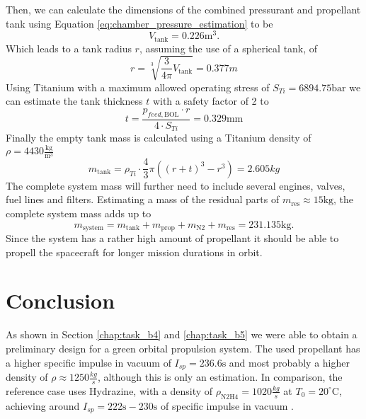 \documentclass[12pt]{article}
\begin{document}
Then, we can calculate the dimensions of the combined pressurant and propellant tank using Equation \ref{eq:chamber_pressure_estimation} to be
\begin{equation*}
	V_{\text{tank}} = 0.226\text{m}^3.
\end{equation*}
Which leads to a tank radius $r$, assuming the use of a spherical tank, of
\begin{equation*}
	r = \sqrt[3]{\frac{3}{4\pi} V_{\text{tank}}} = 0.377m
\end{equation*}
Using Titanium with a maximum allowed operating stress of $S_{Ti}=6894.75\text{bar}$ we can estimate the tank thickness $t$ with a safety factor of 2 to
\begin{equation*}
	t = \frac{p_{feed,\text{BOL}}\cdot r}{4 \cdot S_{Ti}} = 0.329\text{mm}
\end{equation*}
Finally the empty tank mass is calculated using a Titanium density of $\rho=4430\frac{\text{kg}}{\text{m}^3}$
\begin{equation*}
	m_{\text{tank}} = \rho_{Ti} \cdot \frac{4}{3} \pi ((r+t)^3 - r^3) = 2.605kg
\end{equation*}
The complete system mass will further need to include several engines, valves, fuel lines and filters. Estimating a mass of the residual parts of $m_{\text{res}} \approx 15\text{kg}$, the complete system mass adds up to 
\begin{equation*}
m_{\text{system}} = m_{\text{tank}} + m_{\text{prop}} + m_{\text{N2}} + m_{\text{res}} = 231.135\text{kg}.
\end{equation*}
Since the system has a rather high amount of propellant it should be able to propell the spacecraft for longer mission durations in orbit.

\section{Conclusion}
As shown in Section \ref{chap:task_b4} and \ref{chap:task_b5} we were able to obtain a preliminary design for a green orbital propulsion system. The used propellant has a higher specific impulse in vacuum of $I_{sp}=236.6\text{s}$ and most probably a higher density of $\rho\approx1250 \frac{kg}{s}$, although this is only an estimation. In comparison, the reference case uses Hydrazine, with a density of $\rho_{\text{N2H4}}=1020 \frac{kg}{s}$ at $T_0=20^\circ \text{C}$, achieving around $I_{sp} = 222\text{s} - 230\text{s}$ of specific impulse in vacuum \cite{hydrazine}.\\
\end{document}
